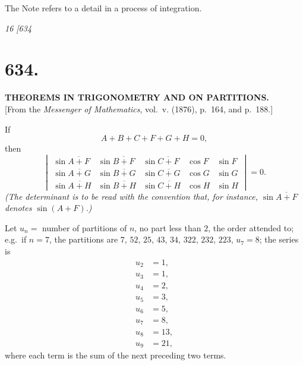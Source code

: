 \documentclass[12pt,a4paper]{article}
\begin{document}
\bigskip

\begin{center}
The Note refers to a detail in a process of integration.
\end{center}

\clearpage
\setcounter{page}{16}

\begin{center}
\textit{16 \hfill \hfill [634}
\end{center}

\section*{634.}

\begin{center}
\textbf{THEOREMS IN TRIGONOMETRY AND ON PARTITIONS.}\\[1em]
[From the \textit{Messenger of Mathematics}, vol.~v. (1876), p.~164, and p.~188.]
\end{center}

If
\[
A + B + C + F + G + H = 0,
\]
then
\[
\begin{vmatrix}
\sin\overline{A+F} & \sin\overline{B+F} & \sin\overline{C+F} & \cos F & \sin F \\
\sin\overline{A+G} & \sin\overline{B+G} & \sin\overline{C+G} & \cos G & \sin G \\
\sin\overline{A+H} & \sin\overline{B+H} & \sin\overline{C+H} & \cos H & \sin H
\end{vmatrix} = 0.
\]
\textit{(The determinant is to be read with the convention that, for instance, $\sin\overline{A+F}$ denotes $\sin(A+F)$.)}

\medskip

Let $u_n =$ number of partitions of $n$, no part less than $2$, the order attended to; e.g.\ if $n = 7$, the partitions are $7$, $52$, $25$, $43$, $34$, $322$, $232$, $223$, $u_7 = 8$; the series is
\begin{align*}
u_2 &= 1, \\
u_3 &= 1, \\
u_4 &= 2, \\
u_5 &= 3, \\
u_6 &= 5, \\
u_7 &= 8, \\
u_8 &= 13, \\
u_9 &= 21,
\end{align*}
where each term is the sum of the next preceding two terms.
\end{document}

